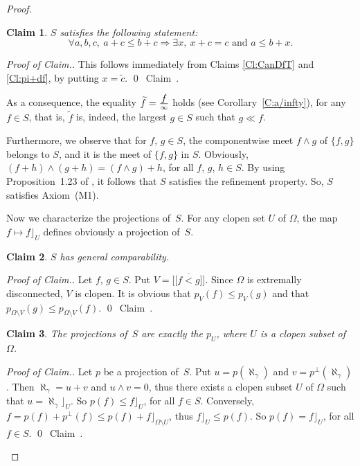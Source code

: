 \documentclass[psamsfonts,reqno]{memo-l}
\theoremstyle{plain}
\newtheorem{claim}{Claim}
\theoremstyle{definition}
\theoremstyle{remark}
\newcommand{\qedc}{{\qed}~{\rm Claim~{\theclaim}.}}
\newenvironment{cproof}
{\begin{proof}[Proof of Claim.]}
{\qedc\renewcommand{\qed}{}\end{proof}}
\numberwithin{equation}{section}
\newcommand{\oll}[1]{\overline{#1}}
\newcommand{\di}[1]{\tfrac{\mathstrut\textstyle{#1}}{\scriptstyle{\infty}}}
\newcommand{\vbv}[1]{{[\![}#1{]\!]}}
\newcommand{\set}[1]{\{#1\}}
\begin{document}
\begin{proof}
\begin{claim}
$S$ satisfies the following statement:
   \[
   \forall a,b,c,\ a+c\leq b+c\Rightarrow\exists x,
   \ x+c=c\text{ and }a\leq b+x.
   \]
\end{claim}

\begin{cproof}
This follows immediately from Claims \ref{Cl:CanDfT} and \ref{Cl:pi+df}, by
putting $x=\tilde{c}$.
\end{cproof}

As a consequence, the equality $\widetilde{f}=\di{f}$ holds (see
Corollary~\ref{C:a/infty}), for any $f\in S$, that is,
$\widetilde{f}$ is, indeed, the largest $g\in S$ such that $g\ll f$.

Furthermore, we observe that for $f$, $g\in S$, the componentwise meet
$f\wedge g$ of $\set{f,g}$ belongs to $S$, and it is the meet of $\set{f,g}$
in $S$. Obviously, $(f+h)\wedge(g+h)=(f\wedge g)+h$, for all $f$, $g$,
$h\in S$. By using Proposition~1.23 of \cite{Wehr92a}, it
follows that $S$ satisfies the refinement property. So, $S$ satisfies
Axiom~(M1).

Now we characterize the projections of~$S$. For any clopen set $U$ of
$\Omega$, the map $f\mapsto f\rfloor_U$ defines obviously a projection of~$S$.

\begin{claim}\label{Cl:SGenComp}
$S$ has general comparability.
\end{claim}

\begin{cproof}
Let $f$, $g\in S$. Put $V=\oll{\vbv{f<g}}$. Since $\Omega$ is extremally
disconnected, $V$ is clopen. It is obvious that $p_V(f)\leq p_V(g)$
and that $p_{\Omega\setminus V}(g)\leq p_{\Omega\setminus V}(f)$.
\end{cproof}

\begin{claim}\label{Cl:ProjPU}
The projections of~$S$ are exactly the $p_U$, where $U$ is a clopen subset
of $\Omega$.
\end{claim}

\begin{cproof}
Let $p$ be a projection of~$S$. Put $u=p(\aleph_\gamma)$ and
$v=p^\bot(\aleph_\gamma)$. Then $\aleph_\gamma=u+v$ and
$u\wedge v=0$, thus there exists a clopen subset $U$ of $\Omega$ such that
$u=\aleph_\gamma\rfloor_U$. So $p(f)\leq f\rfloor_U$, for all $f\in S$.
Conversely, $f=p(f)+p^\bot(f)\leq p(f)+f\rfloor_{\Omega\setminus U}$, thus
$f\rfloor_U\leq p(f)$. So
$p(f)=f\rfloor_U$, for all $f\in S$.
\end{cproof}


\end{proof}
\end{document}
